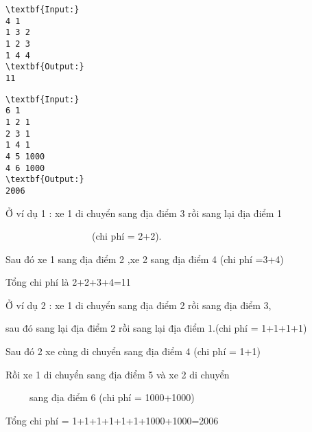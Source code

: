 \begin{verbatim}
\textbf{Input:} 
4 1
1 3 2
1 2 3
1 4 4
\textbf{Output:}
11
\end{verbatim}
\begin{verbatim}
\textbf{Input:} 
6 1
1 2 1
2 3 1
1 4 1
4 5 1000
4 6 1000
\textbf{Output:}
2006\end{verbatim}







Ở ví dụ 1 : xe 1 di chuyển sang địa điểm 3 rồi sang lại địa điểm 1


                  (chi phí = 2+2).


Sau đó xe 1 sang địa điểm 2 ,xe 2 sang địa điểm 4 (chi phí =3+4)


Tổng chi phí là 2+2+3+4=11


Ở ví dụ 2 : xe 1 di chuyển sang địa điểm 2 rồi sang địa điểm 3,


sau đó sang lại địa điểm 2 rồi sang lại địa điểm 1.(chi phí = 1+1+1+1)


Sau đó 2 xe cùng di chuyển sang địa điểm 4 (chi phí = 1+1)


Rồi xe 1 di chuyển sang địa điểm 5 và xe 2 di chuyển


     sang địa điểm 6 (chi phí = 1000+1000)


Tổng chi phí = 1+1+1+1+1+1+1000+1000=2006